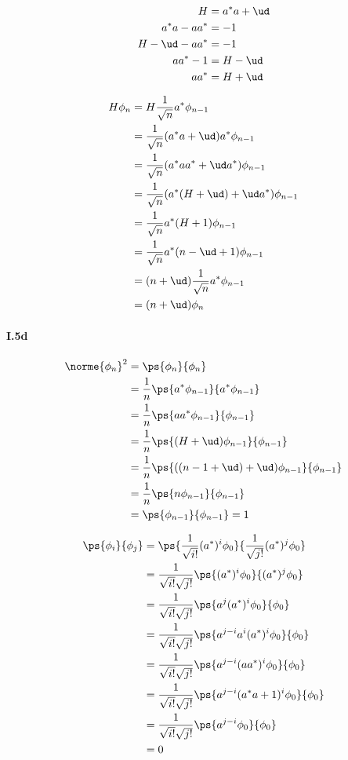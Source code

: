 \begin{align}
    H &= a^* a + \ud \\
    a^* a - a a^* &= -1 \\
    H - \ud - a a^* &= -1 \\
    a a^* - 1 &= H - \ud \\
    a a^* &= H + \ud
\end{align}

\begin{align}
    H \phi_n &= H \frac{1}{\sqrt{n}} a^* \phi_{n-1} \\
    &= \frac{1}{\sqrt{n}} (a^* a + \ud) a^* \phi_{n-1} \\
    &= \frac{1}{\sqrt{n}} (a^* a a^* + \ud a^*) \phi_{n-1} \\
    &= \frac{1}{\sqrt{n}} (a^* (H + \ud) + \ud a^*) \phi_{n-1} \\
    &= \frac{1}{\sqrt{n}} a^*(H + 1) \phi_{n-1} \\
    &= \frac{1}{\sqrt{n}} a^*(n - \ud + 1) \phi_{n-1} \\
    &= (n + \ud) \frac{1}{\sqrt{n}} a^* \phi_{n-1} \\
    &= (n + \ud) \phi_n
\end{align}

\paragraph{I.5d}

\begin{align}
    \norme{\phi_n}^2 &= \ps{\phi_n}{\phi_n} \\
    &= \frac{1}{n} \ps{a^* \phi_{n-1}}{a^* \phi_{n-1}} \\
    &= \frac{1}{n} \ps{a a^* \phi_{n-1}}{\phi_{n-1}} \\
    &= \frac{1}{n} \ps{(H + \ud) \phi_{n-1}}{\phi_{n-1}} \\
    &= \frac{1}{n} \ps{((n-1 + \ud) + \ud) \phi_{n-1}}{\phi_{n-1}} \\
    &= \frac{1}{n} \ps{n \phi_{n-1}}{\phi_{n-1}} \\
    &= \ps{\phi_{n-1}}{\phi_{n-1}}  = 1
\end{align}

\begin{align}
    \ps{\phi_i}{\phi_j}
    &= \ps{\frac{1}{\sqrt{i!}} (a^*)^i \phi_0}{\frac{1}{\sqrt{j!}} (a^*)^j \phi_0} \\
    &= \frac{1}{\sqrt{i!}\sqrt{j!}} \ps{(a^*)^i \phi_0}{(a^*)^j \phi_0} \\
    &= \frac{1}{\sqrt{i!}\sqrt{j!}} \ps{a^j (a^*)^i \phi_0}{\phi_0} \\
    &= \frac{1}{\sqrt{i!}\sqrt{j!}} \ps{a^{j-i} a^i (a^*)^i \phi_0}{\phi_0} \\
    &= \frac{1}{\sqrt{i!}\sqrt{j!}} \ps{a^{j-i} (a a^*)^i \phi_0}{\phi_0} \\
    &= \frac{1}{\sqrt{i!}\sqrt{j!}} \ps{a^{j-i} (a^* a + 1)^i \phi_0}{\phi_0} \\
    &= \frac{1}{\sqrt{i!}\sqrt{j!}} \ps{a^{j-i} \phi_0}{\phi_0} \\
    &= 0
\end{align}

